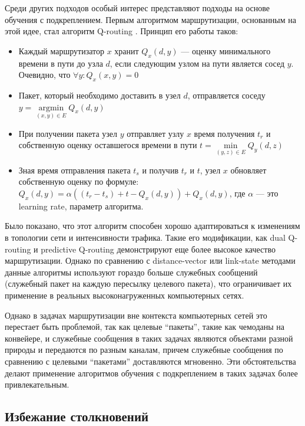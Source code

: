 \documentclass[specification,annotation,times]{itmo-student-thesis}
\DeclareMathOperator{\argmin}{argmin}
\theoremstyle{definition}
\begin{document}
Среди других подходов особый интерес представляют подходы на основе обучения с
подкреплением. Первым алгоритмом маршрутизации, основанным на этой идее, стал
алгоритм Q-routing \cite{q-routing-orig}. Принцип его работы таков:

\begin{itemize}
\item Каждый маршрутизатор $x$ хранит $Q_x(d, y)$ --- оценку минимального
  времени в пути до узла $d$, если следующим узлом на пути является сосед $y$.
  Очевидно, что $\forall y : Q_x(x, y) = 0$ 
\item Пакет, который необходимо доставить в узел $d$, отправляется соседу
  $y = \argmin\limits_{(x, y) \in E} Q_x(d, y)$
\item При получении пакета узел $y$ отправляет узлу $x$ время получения $t_r$ и
  собственную оценку оставшегося времени в пути
  $t = \min\limits_{(y, z) \in E} Q_y(d, z)$
\item Зная время отправления пакета $t_s$ и получив $t_r$ и $t$, узел $x$
  обновляет собственную оценку по формуле:
  $Q_x(d, y) = \alpha((t_r - t_s) + t - Q_x(d, y)) + Q_x(d, y)$,
  где $\alpha$ --- это learning rate, параметр алгоритма.
\end{itemize}

Было показано, что этот алгоритм способен хорошо адаптироваться к изменениям в
топологии сети и интенсивности трафика. Такие его модификации, как dual
Q-routing \cite{dual-q-routing} и predictive Q-routing \cite{predictive-q-routing}
демонстрируют еще более высокое качество маршрутизации. Однако по сравнению с
distance-vector или link-state методами данные алгоритмы используют гораздо
больше служебных сообщений (служебный пакет на каждую пересылку целевого
пакета), что ограничивает их применение в реальных высоконагруженных
компьютерных сетях.

Однако в задачах маршрутизации вне контекста компьютерных сетей это перестает
быть проблемой, так как целевые \enquote{пакеты}, такие как чемоданы на конвейере,
и служебные сообщения в таких задачах являются объектами разной природы и
передаются по разным каналам, причем служебные сообщения по сравнению с целевыми
\enquote{пакетами} доставляются мгновенно. Эти обстоятельства делают применение
алгоритмов обучения с подкреплением в таких задачах более привлекательным.

\subsection{Избежание столкновений}
\end{document}
